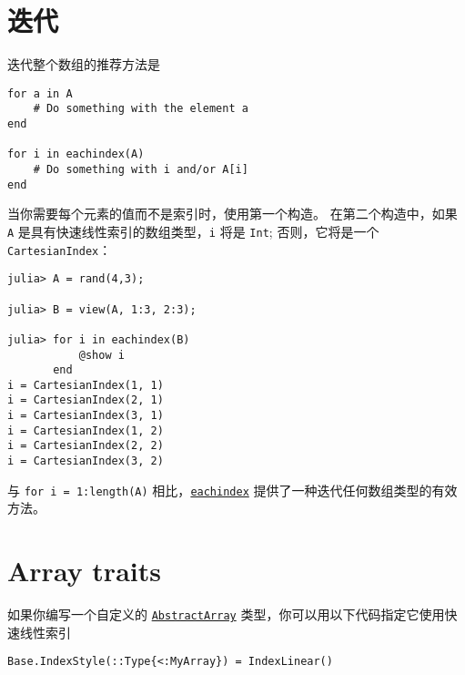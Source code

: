 \hypertarget{5063194151918629111}{}


\section{迭代}



迭代整个数组的推荐方法是




\begin{verbatim}
for a in A
    # Do something with the element a
end

for i in eachindex(A)
    # Do something with i and/or A[i]
end
\end{verbatim}



当你需要每个元素的值而不是索引时，使用第一个构造。 在第二个构造中，如果 \texttt{A} 是具有快速线性索引的数组类型，\texttt{i} 将是 \texttt{Int}; 否则，它将是一个 \texttt{CartesianIndex}：




\begin{verbatim}
julia> A = rand(4,3);

julia> B = view(A, 1:3, 2:3);

julia> for i in eachindex(B)
           @show i
       end
i = CartesianIndex(1, 1)
i = CartesianIndex(2, 1)
i = CartesianIndex(3, 1)
i = CartesianIndex(1, 2)
i = CartesianIndex(2, 2)
i = CartesianIndex(3, 2)
\end{verbatim}



与 \texttt{for i = 1:length(A)} 相比，\hyperlink{4701773772897287974}{\texttt{eachindex}} 提供了一种迭代任何数组类型的有效方法。



\hypertarget{10166346050354504892}{}


\section{Array traits}



如果你编写一个自定义的 \hyperlink{6514416309183787338}{\texttt{AbstractArray}} 类型，你可以用以下代码指定它使用快速线性索引




\begin{verbatim}
Base.IndexStyle(::Type{<:MyArray}) = IndexLinear()
\end{verbatim}



